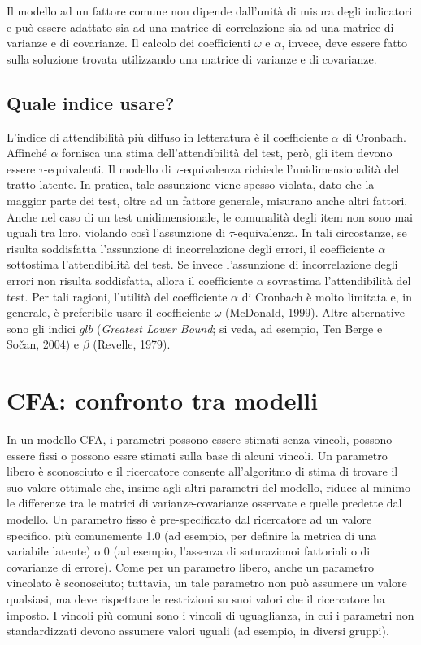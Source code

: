 \documentclass[
  11pt,
]{krantz}
\theoremstyle{definition}
\theoremstyle{definition}
\theoremstyle{definition}
\theoremstyle{definition}
\theoremstyle{remark}
\begin{document}
Il modello ad un fattore comune non dipende dall'unità di misura degli indicatori e può essere adattato sia ad una matrice di correlazione sia ad una matrice di varianze e di covarianze. Il calcolo dei coefficienti \(\omega\) e \(\alpha\), invece, deve essere fatto sulla soluzione trovata utilizzando una matrice di varianze e di covarianze.

\hypertarget{quale-indice-usare}{%
\section{Quale indice usare?}\label{quale-indice-usare}}

L'indice di attendibilità più diffuso in letteratura è il coefficiente \(\alpha\) di Cronbach. Affinché \(\alpha\) fornisca una stima dell'attendibilità del test, però, gli item devono essere \(\tau\)-equivalenti. Il modello di \(\tau\)-equivalenza richiede l'unidimensionalità del tratto latente. In pratica, tale assunzione viene spesso violata, dato che la maggior parte dei test, oltre ad un fattore generale, misurano anche altri fattori. Anche nel caso di un test unidimensionale, le comunalità degli item non sono mai uguali tra loro, violando così l'assunzione di \(\tau\)-equivalenza. In tali circostanze, se risulta soddisfatta l'assunzione di incorrelazione degli errori, il coefficiente \(\alpha\) sottostima l'attendibilità del test. Se invece l'assunzione di incorrelazione degli errori non risulta soddisfatta, allora il coefficiente \(\alpha\) sovrastima l'attendibilità del test. Per tali ragioni, l'utilità del coefficiente \(\alpha\) di Cronbach è molto limitata e, in generale, è preferibile usare il coefficiente \(\omega\) (McDonald, 1999). Altre alternative sono gli indici \(glb\) (\emph{Greatest Lower Bound}; si veda, ad esempio, Ten Berge e Sočan, 2004) e \(\beta\) (Revelle, 1979).

\hypertarget{ch:cfa-cong-parall}{%
\chapter{CFA: confronto tra modelli}\label{ch:cfa-cong-parall}}

In un modello CFA, i parametri possono essere stimati senza vincoli, possono essere fissi o possono essre stimati sulla base di alcuni vincoli. Un parametro libero è sconosciuto e il ricercatore consente all'algoritmo di stima di trovare il suo valore ottimale che, insime agli altri parametri del modello, riduce al minimo le differenze tra le matrici di varianze-covarianze osservate e quelle predette dal modello. Un parametro fisso è pre-specificato dal ricercatore ad un valore specifico, più comunemente 1.0 (ad esempio, per definire la metrica di una variabile latente) o 0 (ad esempio, l'assenza di saturazionoi fattoriali o di covarianze di errore). Come per un parametro libero, anche un parametro vincolato è sconosciuto; tuttavia, un tale parametro non può assumere un valore qualsiasi, ma deve rispettare le restrizioni su suoi valori che il ricercatore ha imposto. I vincoli più comuni sono i vincoli di uguaglianza, in cui i parametri non standardizzati devono assumere valori uguali (ad esempio, in diversi gruppi).
\end{document}
